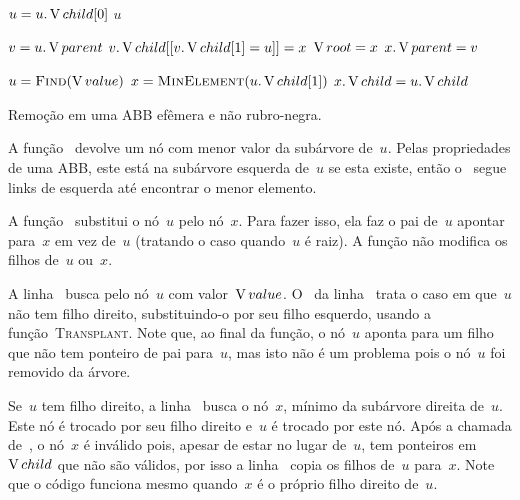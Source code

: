 \documentclass[main.tex]{subfiles}
\begin{document}
\begin{algorithm}
\begin{algorithmic}[1]

		\State $u = u.\operatorname{V}{child}[0]$
	\EndWhile
	\State \Return $u$
\EndFunction

	\State $v = u.\operatorname{V}{parent}$
		\State $v.\operatorname{V}{child}[[v.\operatorname{V}{child}[1] = u]] = x$
	\Else
		\State $\operatorname{V}{root} = x$
	\EndIf
		\State $x.\operatorname{V}{parent} = v$
	\EndIf
\EndFunction

	\State $u = \Call{Find}{\val}$ \label{line:rmabb:findb}
	 \label{line:rmabb:if1}
		\State {}
	\Else
		\State $x = \Call{MinElement}{u.\child[1]}$ \label{line:rmabb:minb}
		\State {}
		\State {}
		\State $x.\operatorname{V}{child} = u.\operatorname{V}{child}$ \label{line:rmabb:cpchild}
	\EndIf
\EndFunction

\end{algorithmic}
\caption{Remoção em uma ABB efêmera e não rubro-negra.} \label{lst:abb_remove}
\end{algorithm}

A função~ devolve um nó com menor valor da subárvore de~$u$. Pelas propriedades de uma ABB, este está na subárvore esquerda de~$u$ se esta existe, então o~ segue links de esquerda até encontrar o menor elemento.

A função~ substitui o nó~$u$ pelo nó~$x$. Para fazer isso, ela faz o pai de~$u$ apontar para~$x$ em vez de~$u$ (tratando o caso quando~$u$ é raiz). A função não modifica os filhos de~$u$ ou~$x$.

A linha~ busca pelo nó~$u$ com valor~$\operatorname{V}{value}$. O~ da linha~ trata o caso em que~$u$ não tem filho direito, substituindo-o por seu filho esquerdo, usando a função~\textsc{Transplant}. Note que, ao final da função, o nó~$u$ aponta para um filho que não tem ponteiro de pai para~$u$, mas isto não é um problema pois o nó~$u$ foi removido da árvore.

Se~$u$ tem filho direito, a linha~ busca o nó~$x$, mínimo da subárvore direita de~$u$. Este nó é trocado por seu filho direito e~$u$ é trocado por este nó. Após a chamada de~, o nó~$x$ é inválido pois, apesar de estar no lugar de~$u$, tem ponteiros em~$\operatorname{V}{child}$ que não são válidos, por isso a linha~ copia os filhos de~$u$ para~$x$. Note que o código funciona mesmo quando~$x$ é o próprio filho direito de~$u$.
\end{document}
